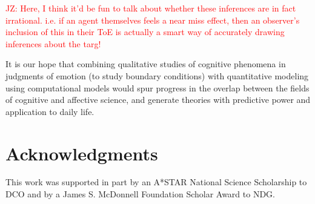 \documentclass[10pt,letterpaper]{article}
\newcommand{\red}[1]{\textcolor{Red}{#1}}
\begin{document}
\red{JZ: Here, I think it'd be fun to talk about whether these inferences are in fact irrational.  i.e. if an agent themselves feels a near miss effect, then an observer's inclusion of this in their ToE is actually a smart way of accurately drawing inferences about the targ!}

	It is our hope that combining qualitative studies of cognitive phenomena in judgments of emotion (to study boundary conditions) with quantitative modeling using computational models would spur progress in the overlap between the fields of cognitive and affective science, and generate theories with predictive power and application to daily life.


\section{Acknowledgments}

This work was supported in part by an A*STAR National Science Scholarship to DCO and by a James S. McDonnell Foundation Scholar Award to NDG.




\setlength{\bibleftmargin}{.125in}
\setlength{\bibindent}{-\bibleftmargin}




	
\end{document}
